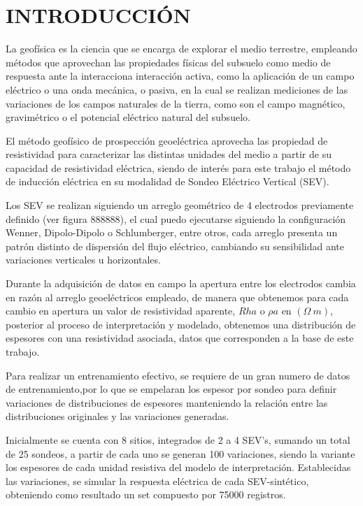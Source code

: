 \chapter{INTRODUCCIÓN}
La geofísica es la ciencia que se encarga de explorar el medio terrestre, empleando métodos que aprovechan las propiedades físicas del subsuelo como medio de respuesta ante la interacciona interacción activa, como la aplicación de un campo eléctrico o una onda mecánica,  o pasiva, en la cual se realizan mediciones de las variaciones de los campos naturales de la tierra, como son el campo magnético, gravimétrico o el potencial eléctrico natural del subsuelo.

El método geofísico de prospección geoeléctrica aprovecha las propiedad de resistividad para caracterizar las distintas unidades del medio a partir de su capacidad de resistividad eléctrica, siendo de interés para este trabajo el método de inducción eléctrica en su modalidad de Sondeo Eléctrico Vertical (SEV).

Los SEV se realizan siguiendo un arreglo geométrico de 4 electrodos previamente definido (ver figura 888888), el cual puedo ejecutarse siguiendo la configuración Wenner, Dipolo-Dipolo o Schlumberger, entre otros, cada arreglo presenta un patrón distinto de dispersión del flujo eléctrico, cambiando su sensibilidad ante variaciones verticales u horizontales. 

Durante la adquisición de datos en campo la apertura entre los electrodos cambia en razón al arreglo geoeléctricos empleado, de manera que obtenemos para cada cambio en apertura un valor de resistividad aparente, $Rha$ o $\rho a$ en $(\varOmega\ m)$, posterior al proceso de interpretación y modelado, obtenemos una distribución de espesores con una resistividad asociada, datos que corresponden a la base de este trabajo.

Para realizar un entrenamiento efectivo, se requiere de un gran numero de datos de entrenamiento,por lo que se empelaran los espesor por sondeo para definir variaciones de distribuciones de espesores manteniendo la relación entre las distribuciones originales y las variaciones generadas.

Inicialmente se cuenta con 8 sitios, integrados de 2 a 4 SEV's, sumando un total de 25 sondeos, a partir de cada uno se generan 100 variaciones, siendo la variante los espesores de cada unidad resistiva del modelo de interpretación.%
Establecidas las variaciones, se simular la respuesta eléctrica de cada SEV-sintético, obteniendo como resultado un set compuesto por 75000 registros.%

